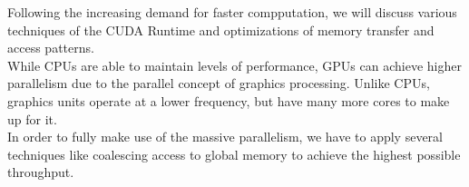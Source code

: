 Following the increasing demand for faster compputation, we will discuss various techniques of the CUDA Runtime and optimizations of memory transfer and access patterns.\\
While CPUs are able to maintain levels of performance, GPUs can achieve higher parallelism due to the parallel concept of graphics processing. Unlike CPUs, graphics units operate at a lower frequency, but have many more cores to make up for it.\\
In order to fully make use of the massive parallelism, we have to apply several techniques like coalescing access to global memory to achieve the highest possible throughput.\\
